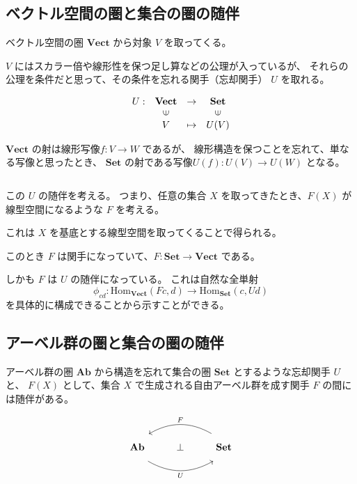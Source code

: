 \documentclass[uplatex,a4j,12pt,dvipdfmx]{jsarticle}
\begin{document}
\subsection{ベクトル空間の圏と集合の圏の随伴}

ベクトル空間の圏 $\mathbf{Vect}$ から対象 $V$ を取ってくる。

$V$ にはスカラー倍や線形性を保つ足し算などの公理が入っているが、
それらの公理を条件だと思って、その条件を忘れる関手（忘却関手） $U$ を取れる。

\[
	\begin{array}{cccc}
		U : & \textbf{Vect}           & \to     & \textbf{Set}            \\
		    & \rotatebox{90}{${\in}$} &         & \rotatebox{90}{${\in}$} \\
		    & V                       & \mapsto & U(V)
	\end{array}
\]

$\textbf{Vect}$ の射は線形写像$f:V \to W$ であるが、
線形構造を保つことを忘れて、単なる写像と思ったとき、
$\textbf{Set}$ の射である写像$U(f):U(V) \to U(W)$
となる。

${}$

この $U$ の随伴を考える。
つまり、任意の集合 $X$ を取ってきたとき、$F(X)$ が線型空間になるような $F$ を考える。

これは $X$ を基底とする線型空間を取ってくることで得られる。

このとき $F$ は関手になっていて、$F : \mathbf{Set} \to \mathbf{Vect}$ である。

しかも $F$ は $U$ の随伴になっている。
これは自然な全単射
$$
	\phi_{cd} : \mathrm{Hom}_{\mathbf{Vect}}(Fc,d) \to \mathrm{Hom}_{\mathbf{Set}}(c,Ud)
$$
を具体的に構成できることから示すことができる。


\subsection{アーベル群の圏と集合の圏の随伴}

アーベル群の圏 $\mathbf{Ab}$ から構造を忘れて集合の圏 $\mathbf{Set}$ とするような忘却関手 $U$ と、
$F(X)$ として、集合 $X$ で生成される自由アーベル群を成す関手 $F$ の間には随伴がある。

\[
	\begin{tikzcd}
		\mathbf{Ab} \arrow[rr, "U"', bend right, shift right=3] & \bot & \mathbf{Set} \arrow[ll, "F"', bend right, shift right=3]
	\end{tikzcd}
\]
\end{document}
